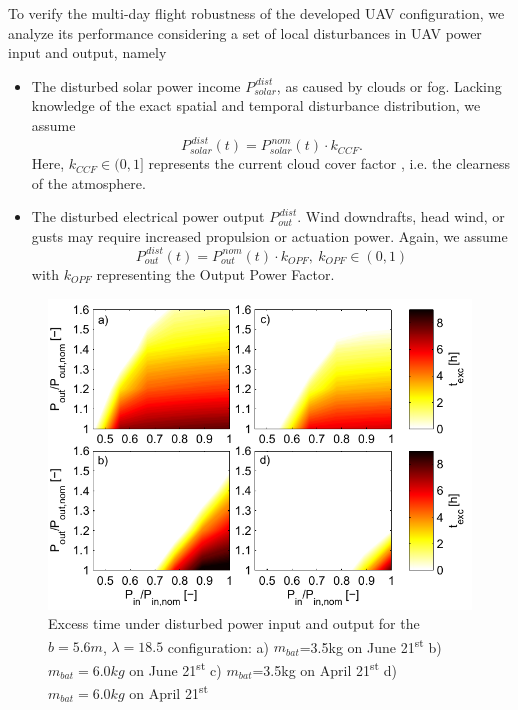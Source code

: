 To verify the multi-day flight robustness of the developed UAV configuration, we analyze its performance considering a set of local disturbances in UAV power input and output, namely
\begin{itemize}
\item The disturbed solar power income $P_{solar}^{\,dist}$, as caused by clouds or fog. Lacking knowledge of the exact spatial and temporal disturbance distribution, we assume
\begin{equation}
P_{solar}^{\,dist}(t) = P_{solar}^{\,nom}(t) \cdot k_{CCF}.
\end{equation}
Here, $k_{CCF} \in (0,1]$  represents the current cloud cover factor \cite{Kimura_SolarRadAndClouds}, i.e. the clearness of the atmosphere.
\item The disturbed electrical power output $P_{out}^{\,dist}$. Wind downdrafts, head wind, or gusts may require increased propulsion or actuation power. Again, we assume 
\begin{equation}
P_{out}^{\,dist}(t) = P_{out}^{\,nom}(t) \cdot k_{OPF},~k_{OPF} \in (0,1)
\end{equation}
with $k_{OPF}$ representing the Output Power Factor.
\end{itemize}
\begin{figure}
    \centering
    \includegraphics[width=\linewidth]{images/5_texcRobustness/5_texcRobustness.pdf}
    \caption{Excess time under disturbed power input and output for the $b=5.6m$, $\lambda=18.5$ configuration: a) $m_{bat}$=3.5kg on June 21\textsuperscript{st} b) $m_{bat}=6.0kg$ on June 21\textsuperscript{st} c) $m_{bat}$=3.5kg on April 21\textsuperscript{st} d) $m_{bat}=6.0kg$ on April 21\textsuperscript{st} }
    \label{fig:ExcessTimeRobustness}
\end{figure}
